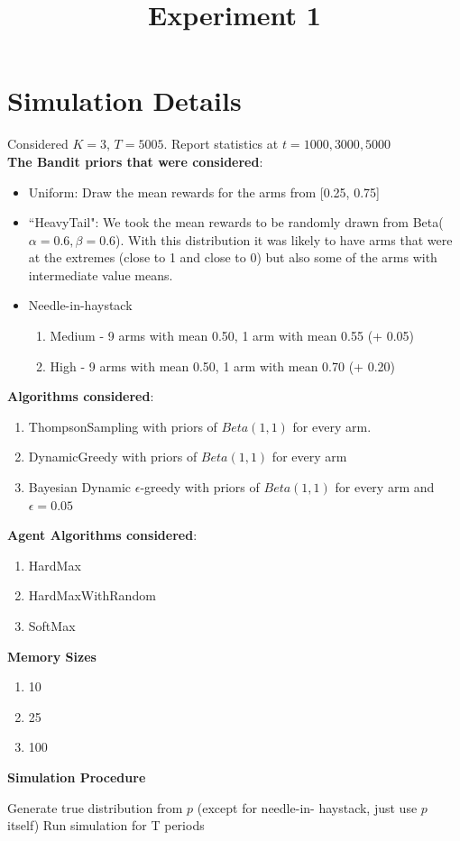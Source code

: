 \documentclass[11pt,letterpaper]{article}
\begin{document}
 

\title{Experiment 1}
\maketitle

\section*{Simulation Details}

Considered $K = 3$, $T = 5005$. Report statistics at $t = 1000, 3000, 5000$ \\
\textbf{The Bandit priors that were considered}:
\begin{itemize}
\item Uniform: Draw the mean rewards for the arms from [0.25, 0.75]
\item ``HeavyTail": We took the mean rewards to be randomly drawn from Beta($\alpha=0.6,\beta=0.6$). With this distribution it was likely to have arms that were at the extremes (close to 1 and close to 0) but also some of the arms with intermediate value means.
\item Needle-in-haystack
\begin{enumerate}
\item Medium - 9 arms with mean 0.50, 1 arm with mean 0.55 (+ 0.05)
\item High - 9 arms with mean 0.50, 1 arm with mean 0.70 (+ 0.20)
\end{enumerate}
\end{itemize}
\textbf{Algorithms considered}:
\begin{enumerate}
\item ThompsonSampling with priors of $Beta(1, 1)$ for every arm.
\item DynamicGreedy with priors of $Beta(1, 1)$ for every arm
\item Bayesian Dynamic $\epsilon$-greedy with priors of $Beta(1, 1)$ for every arm and $\epsilon=0.05$
\end{enumerate}
\textbf{Agent Algorithms considered}:
\begin{enumerate}
\item HardMax
\item HardMaxWithRandom
\item SoftMax
\end{enumerate}
\textbf{Memory Sizes}
\begin{enumerate}
\item 10
\item 25
\item 100
\end{enumerate}
\pagebreak
\textbf{Simulation Procedure}
\begin{algorithm}
\begin{algorithmic}[1]
				\State Generate true distribution from $p$ (except for needle-in-		haystack, just use $p$ itself)
				\State Run simulation for T periods
			\EndFor
		\EndFor
	\EndFor
\EndFor
\end{algorithmic}
\end{algorithm}
\end{document}
